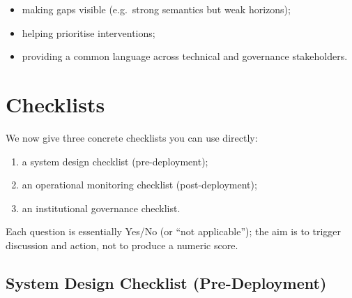 \begin{itemize}
  \item making gaps visible (e.g.\ strong semantics but weak horizons);
  \item helping prioritise interventions;
  \item providing a common language across technical and governance
        stakeholders.
\end{itemize}

\section{Checklists}

We now give three concrete checklists you can use directly:

\begin{enumerate}
  \item a system design checklist (pre-deployment);
  \item an operational monitoring checklist (post-deployment);
  \item an institutional governance checklist.
\end{enumerate}

Each question is essentially Yes/No (or ``not applicable''); the aim is
to trigger discussion and action, not to produce a numeric score.

\subsection{System Design Checklist (Pre-Deployment)}


